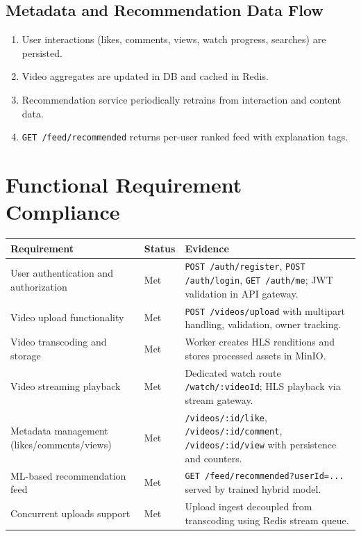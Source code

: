 \documentclass[11pt,a4paper]{article}
\begin{document}
\subsection{Metadata and Recommendation Data Flow}
\begin{enumerate}[leftmargin=1.4em]
  \item User interactions (likes, comments, views, watch progress, searches) are persisted.
  \item Video aggregates are updated in DB and cached in Redis.
  \item Recommendation service periodically retrains from interaction and content data.
  \item \texttt{GET /feed/recommended} returns per-user ranked feed with explanation tags.
\end{enumerate}

\section{Functional Requirement Compliance}
\begin{longtable}{@{}p{4.5cm}p{2.2cm}p{7.8cm}@{}}
\toprule
\textbf{Requirement} & \textbf{Status} & \textbf{Evidence} \\
\midrule
\endhead
User authentication and authorization & Met & \texttt{POST /auth/register}, \texttt{POST /auth/login}, \texttt{GET /auth/me}; JWT validation in API gateway. \\
Video upload functionality & Met & \texttt{POST /videos/upload} with multipart handling, validation, owner tracking. \\
Video transcoding and storage & Met & Worker creates HLS renditions and stores processed assets in MinIO. \\
Video streaming playback & Met & Dedicated watch route \texttt{/watch/:videoId}; HLS playback via stream gateway. \\
Metadata management (likes/comments/views) & Met & \texttt{/videos/:id/like}, \texttt{/videos/:id/comment}, \texttt{/videos/:id/view} with persistence and counters. \\
ML-based recommendation feed & Met & \texttt{GET /feed/recommended?userId=...} served by trained hybrid model. \\
Concurrent uploads support & Met & Upload ingest decoupled from transcoding using Redis stream queue. \\
\bottomrule
\end{longtable}
\end{document}
